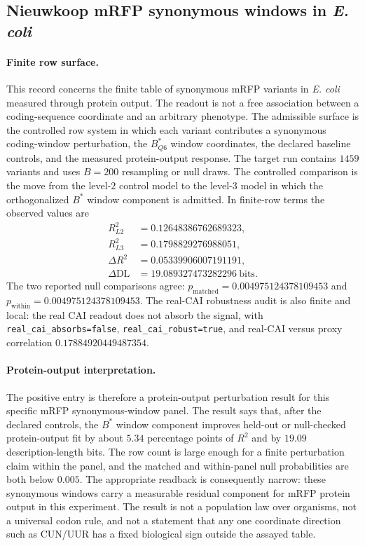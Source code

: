 \subsection{Nieuwkoop mRFP synonymous windows in \textit{E. coli}}
\label{sec:bioreality-nieuwkoop-ecoli-mrfp-protein-output}

\paragraph{Finite row surface.}
This record concerns the finite table of synonymous mRFP variants in \textit{E. coli} measured through protein output.  The readout is not a free association between a coding-sequence coordinate and an arbitrary phenotype.  The admissible surface is the controlled row system in which each variant contributes a synonymous coding-window perturbation, the $B^\ast_{Q6}$ window coordinates, the declared baseline controls, and the measured protein-output response.  The target run contains $1459$ variants and uses $B=200$ resampling or null draws.  The controlled comparison is the move from the level-$2$ control model to the level-$3$ model in which the orthogonalized $B^\ast$ window component is admitted.  In finite-row terms the observed values are
$$
\begin{aligned}
R^2_{L2} &= 0.12648386762689323,\\
R^2_{L3} &= 0.1798829276988051,\\
\Delta R^2 &= 0.05339906007191191,\\
\Delta \mathrm{DL} &= 19.089327473282296\ \mathrm{bits}.
\end{aligned}
$$
The two reported null comparisons agree: $p_{\mathrm{matched}}=0.004975124378109453$ and $p_{\mathrm{within}}=0.004975124378109453$.  The real-CAI robustness audit is also finite and local: the real CAI readout does not absorb the signal, with \texttt{real\_cai\_absorbs=false}, \texttt{real\_cai\_robust=true}, and real-CAI versus proxy correlation $0.17884920449487354$.

\paragraph{Protein-output interpretation.}
The positive entry is therefore a protein-output perturbation result for this specific mRFP synonymous-window panel.  The result says that, after the declared controls, the $B^\ast$ window component improves held-out or null-checked protein-output fit by about $5.34$ percentage points of $R^2$ and by $19.09$ description-length bits.  The row count is large enough for a finite perturbation claim within the panel, and the matched and within-panel null probabilities are both below $0.005$.  The appropriate readback is consequently narrow: these synonymous windows carry a measurable residual component for mRFP protein output in this experiment.  The result is not a population law over organisms, not a universal codon rule, and not a statement that any one coordinate direction such as CUN/UUR has a fixed biological sign outside the assayed table.

